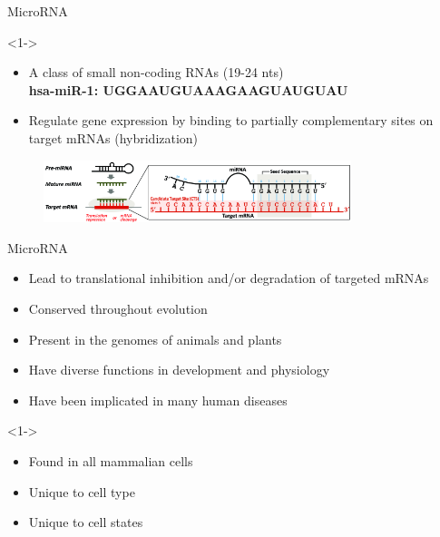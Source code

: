 \documentclass{beamer}
\begin{document}
\begin{frame}{MicroRNA}
	\begin{exampleblock}
		<1->{}
		\begin{itemize}
			\item A class of small non-coding RNAs (19-24 nts)\\
			      \textbf{hsa-miR-1: UGGAAUGUAAAGAAGUAUGUAU
			      	}\item Regulate gene expression by binding to partially complementary sites
			      on target mRNAs (hybridization)
		\end{itemize}
	\end{exampleblock}
	\begin{itemize}
	\end{itemize}
	\begin{figure}[ht!]
		\centering
			\includegraphics[width=0.8\textwidth]{images/mirna-target.png}
		\end{figure}
\end{frame}


\begin{frame}{MicroRNA}
	\begin{itemize}
\item Lead to translational inhibition and/or degradation of targeted mRNAs
\item Conserved throughout evolution
\item Present in the genomes of animals and plants  
\item Have diverse functions in development and physiology
\item Have been implicated in many human diseases
\end{itemize}
	\begin{exampleblock}
		<1->{}
		\begin{itemize}
			\item Found in all mammalian cells
			\item Unique to cell type
			\item Unique to cell states
		\end{itemize}
	\end{exampleblock}

\end{frame}
\end{document}
